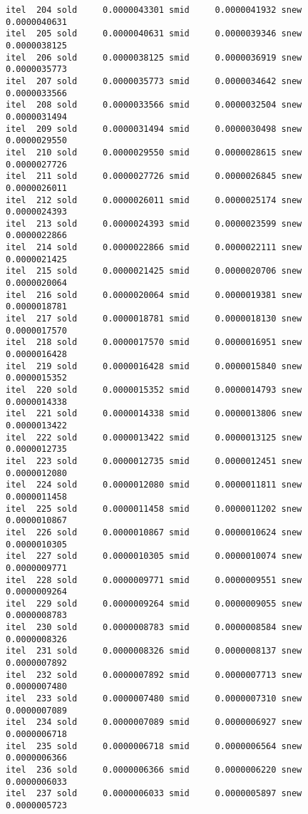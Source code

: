 \documentclass[
  12pt,
  letterpaper,
  DIV=11,
  numbers=noendperiod]{scrartcl}
\begin{document}
\begin{verbatim}
itel  204 sold     0.0000043301 smid     0.0000041932 snew     0.0000040631 
itel  205 sold     0.0000040631 smid     0.0000039346 snew     0.0000038125 
itel  206 sold     0.0000038125 smid     0.0000036919 snew     0.0000035773 
itel  207 sold     0.0000035773 smid     0.0000034642 snew     0.0000033566 
itel  208 sold     0.0000033566 smid     0.0000032504 snew     0.0000031494 
itel  209 sold     0.0000031494 smid     0.0000030498 snew     0.0000029550 
itel  210 sold     0.0000029550 smid     0.0000028615 snew     0.0000027726 
itel  211 sold     0.0000027726 smid     0.0000026845 snew     0.0000026011 
itel  212 sold     0.0000026011 smid     0.0000025174 snew     0.0000024393 
itel  213 sold     0.0000024393 smid     0.0000023599 snew     0.0000022866 
itel  214 sold     0.0000022866 smid     0.0000022111 snew     0.0000021425 
itel  215 sold     0.0000021425 smid     0.0000020706 snew     0.0000020064 
itel  216 sold     0.0000020064 smid     0.0000019381 snew     0.0000018781 
itel  217 sold     0.0000018781 smid     0.0000018130 snew     0.0000017570 
itel  218 sold     0.0000017570 smid     0.0000016951 snew     0.0000016428 
itel  219 sold     0.0000016428 smid     0.0000015840 snew     0.0000015352 
itel  220 sold     0.0000015352 smid     0.0000014793 snew     0.0000014338 
itel  221 sold     0.0000014338 smid     0.0000013806 snew     0.0000013422 
itel  222 sold     0.0000013422 smid     0.0000013125 snew     0.0000012735 
itel  223 sold     0.0000012735 smid     0.0000012451 snew     0.0000012080 
itel  224 sold     0.0000012080 smid     0.0000011811 snew     0.0000011458 
itel  225 sold     0.0000011458 smid     0.0000011202 snew     0.0000010867 
itel  226 sold     0.0000010867 smid     0.0000010624 snew     0.0000010305 
itel  227 sold     0.0000010305 smid     0.0000010074 snew     0.0000009771 
itel  228 sold     0.0000009771 smid     0.0000009551 snew     0.0000009264 
itel  229 sold     0.0000009264 smid     0.0000009055 snew     0.0000008783 
itel  230 sold     0.0000008783 smid     0.0000008584 snew     0.0000008326 
itel  231 sold     0.0000008326 smid     0.0000008137 snew     0.0000007892 
itel  232 sold     0.0000007892 smid     0.0000007713 snew     0.0000007480 
itel  233 sold     0.0000007480 smid     0.0000007310 snew     0.0000007089 
itel  234 sold     0.0000007089 smid     0.0000006927 snew     0.0000006718 
itel  235 sold     0.0000006718 smid     0.0000006564 snew     0.0000006366 
itel  236 sold     0.0000006366 smid     0.0000006220 snew     0.0000006033 
itel  237 sold     0.0000006033 smid     0.0000005897 snew     0.0000005723 

\end{verbatim}
\end{document}
